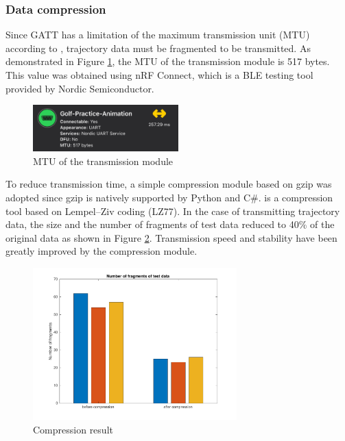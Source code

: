 \subsubsection{Data compression}
Since GATT has a limitation of the maximum transmission unit (MTU) according to \textcite{bluetooth}, trajectory data must be fragmented to be transmitted. As demonstrated in Figure \ref{fig:mtu}, the MTU of the transmission module is 517 bytes. This value was obtained using nRF Connect, which is a BLE testing tool provided by Nordic Semiconductor.
\begin{figure}[H]
    \centering
    \includegraphics[width=0.5\textwidth]{figure/mtu.pdf}
    \caption{MTU of the transmission module}
    \label{fig:mtu}
\end{figure}
To reduce transmission time, a simple compression module based on gzip was adopted since gzip is natively supported by Python and C\#. \textcite{gzip} is a compression tool based on Lempel–Ziv coding (LZ77). In the case of transmitting trajectory data, the size and the number of fragments of test data reduced to 40\% of the original data as shown in Figure \ref{fig:compress}. Transmission speed and stability have been greatly improved by the compression module.
\begin{figure}[H]
    \centering
    \includegraphics[width=0.7\textwidth]{figure/compression.pdf}
    \caption{Compression result}
    \label{fig:compress}
\end{figure}


